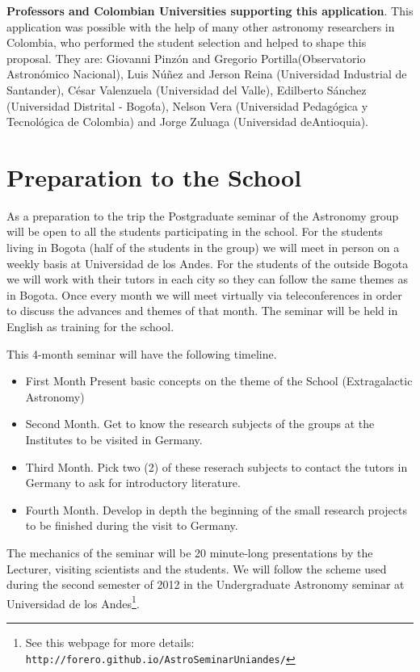 \documentclass[12pt]{article}
\begin{document}
{\bf Professors and Colombian Universities supporting this application}. This application was
possible with the help of many other astronomy researchers in
Colombia, who performed the student selection and helped to shape this
proposal. They are: Giovanni Pinz\'on and Gregorio
Portilla(Observatorio Astron\'omico Nacional), Luis N\'u\~nez and
Jerson Reina (Universidad Industrial de Santander), C\'esar Valenzuela
(Universidad del Valle), Edilberto S\'anchez (Universidad Distrital -
Bogo\'ta), Nelson Vera (Universidad Pedag\'ogica y Tecnol\'ogica de
Colombia) and Jorge Zuluaga (Universidad deAntioquia). 


\section{Preparation to the School}
\label{sec:preparation}

As a preparation to the trip the Postgraduate seminar of the Astronomy
group will be open to all the students participating in the
school. For the students living in Bogota (half of the students in
the group) we will meet in person on a weekly basis at Universidad de
los Andes. For the students of the outside Bogota we will work with
their tutors in each city so they can follow the same themes as in
Bogota. Once every month we will meet virtually via teleconferences in
order to discuss the advances and themes of that month. The seminar
will be held in English as training for the school. 

This 4-month seminar will have the following timeline.
\begin{itemize}
\item First Month Present basic concepts on the theme of the School
  (Extragalactic Astronomy)
\item Second Month. Get to know the research subjects of the groups at
  the Institutes to be visited in Germany.
\item Third Month. Pick two (2) of these reserach subjects to contact
  the tutors in Germany to ask for introductory literature.
\item Fourth Month. Develop in depth the beginning of the small
  research projects to be finished during the visit to Germany. 
\end{itemize}

The mechanics of the seminar will be 20 minute-long presentations by the
Lecturer, visiting scientists and the students. We will follow the
scheme used during the second semester of 2012 in the Undergraduate
Astronomy seminar at Universidad de los Andes\footnote{See this
  webpage for more details:
  \verb"http://forero.github.io/AstroSeminarUniandes/"}. 
\end{document}
